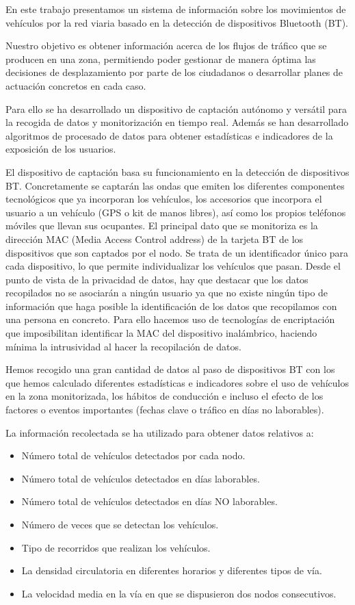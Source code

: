 \documentclass[twocolumn,twoside]{Jornadas}
\begin{document}
En este trabajo presentamos un sistema de información sobre los movimientos de vehículos por la red viaria basado en la detección de dispositivos Bluetooth (BT). 

Nuestro objetivo es obtener información acerca de los flujos de tráfico que se producen en una zona, permitiendo poder gestionar de manera óptima las 
decisiones de desplazamiento por parte de los ciudadanos o desarrollar planes de actuación concretos en cada caso. 

Para ello se ha desarrollado un dispositivo de captación autónomo y versátil para la recogida de datos y monitorización en tiempo real. Además se han desarrollado algoritmos de procesado de datos para obtener estadísticas e indicadores de la exposición de los usuarios.

El dispositivo de captación basa su funcionamiento en la detección de dispositivos BT. 
Concretamente se captarán las ondas que emiten los diferentes componentes tecnológicos que ya incorporan los vehículos, 
los accesorios que incorpora el usuario a un vehículo (GPS o kit de manos libres), así como los propios teléfonos móviles que llevan sus ocupantes.
El principal dato que se monitoriza es la dirección MAC (Media Access Control address) de la tarjeta BT de los dispositivos que son captados por el nodo. 
Se trata de un identificador único para cada dispositivo, lo que permite individualizar los vehículos que pasan.
Desde el punto de vista de la privacidad de datos, hay que destacar que los datos recopilados no se asociarán a ningún usuario ya que no existe ningún 
tipo de información que haga posible la identificación de los datos que recopilamos con una persona en concreto. 
Para ello hacemos uso de tecnologías de encriptación que imposibilitan identificar la MAC del dispositivo inalámbrico, haciendo mínima la intrusividad al hacer la recopilación de datos.


Hemos recogido una gran cantidad de datos al paso de dispositivos BT con los que hemos calculado diferentes estadísticas e indicadores sobre el uso de vehículos en la zona monitorizada, los hábitos de conducción e incluso el efecto de los factores o eventos importantes (fechas clave o tráfico en días no laborables).

La información recolectada se ha utilizado para obtener datos relativos a:
\begin{itemize}
 \item Número total de vehículos detectados por cada nodo.
 \item Número total de vehículos detectados en días laborables.
 \item Número total de vehículos detectados en días NO laborables.
 \item Número de veces que se detectan los vehículos.
 \item Tipo de recorridos que realizan los vehículos.
 \item La densidad circulatoria en diferentes horarios y diferentes tipos de vía.
 \item La velocidad media en la vía en que se dispusieron dos nodos consecutivos.
\end{itemize}
\end{document}
